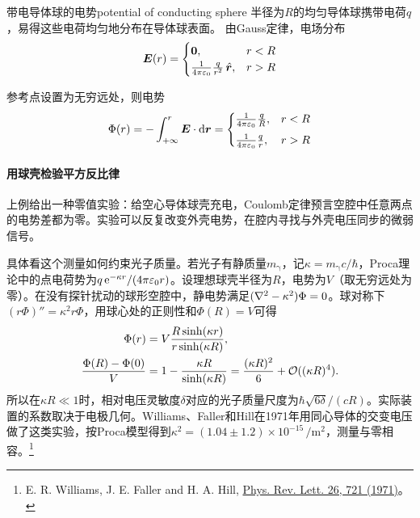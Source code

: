 \begin{example}{带电导体球的电势}{potential of conducting sphere}
    半径为$R$的均匀导体球携带电荷$q$，易得这些电荷均匀地分布在导体球表面。
    由Gauss定律，电场分布
    \begin{equation}
        \label{eq:ed-charged-shell-field}
        \bm E(r) =
        \begin{cases}
            \bm 0,&r < R\\
            \frac1{4\pi\varepsilon_0}\frac q{r^2}\mathop{}\!\hat{\bm{r}},&r > R
        \end{cases}
    \end{equation}

    参考点设置为无穷远处，则电势
    \begin{equation}
        \label{eq:ed-charged-shell-potential}
        \Phi(r) = -\int_{+\infty}^r\bm E \cdot \mathop{}\!\mathrm{d}\bm r =
        \begin{cases}
            \frac1{4\pi\varepsilon_0}\frac qR,&r < R\\[1ex]
            \frac1{4\pi\varepsilon_0}\frac qr,&r > R
        \end{cases}
    \end{equation}
    \begin{notecaptionblock}
        \label{fig:conducting sphere}
    \end{notecaptionblock}
\end{example}

\paragraph{用球壳检验平方反比律}
\label{par:photon mass test}
上例给出一种零值实验：给空心导体球壳充电，Coulomb定律预言空腔中任意两点的电势差都为零。实验可以反复改变外壳电势，在腔内寻找与外壳电压同步的微弱信号。

具体看这个测量如何约束光子质量。若光子有静质量$m_\upgamma$，记$\kappa = m_\upgamma c/\hbar$，Proca理论中的点电荷势为$q\mathop{}\!\mathrm{e}^{-\kappa r}/(4\pi\varepsilon_0r)$。设理想球壳半径为$R$，电势为$V$（取无穷远处为零）。在没有探针扰动的球形空腔中，静电势满足$(\nabla^2 - \kappa^2)\Phi = 0$。球对称下$(r\Phi)'' = \kappa^2 r\Phi$，用球心处的正则性和$\Phi(R) = V$可得
\begin{subequations}
    \label{eq:ed-proca-cavity-voltage}
    \begin{align}
        \Phi(r) &= V\frac{R\sinh(\kappa r)}{r\sinh(\kappa R)},\\
        \frac{\Phi(R) - \Phi(0)}{V}
        &= 1 - \frac{\kappa R}{\sinh(\kappa R)}
        = \frac{(\kappa R)^2}{6} + \mathcal{O}((\kappa R)^4).
    \end{align}
\end{subequations}
所以在$\kappa R \ll 1$时，相对电压灵敏度$\delta$对应的光子质量尺度为$\hbar\sqrt{6\delta}/(cR)$。实际装置的系数取决于电极几何。Williams、Faller和Hill在1971年用同心导体的交变电压做了这类实验，按Proca模型得到$\kappa^2 = (1.04 \pm 1.2) \times 10^{-15}\,\si{\per\metre\squared}$，测量与零相容。\footnote{E. R. Williams, J. E. Faller and H. A. Hill, \href{https://doi.org/10.1103/PhysRevLett.26.721}{Phys. Rev. Lett. 26, 721 (1971)}。}


